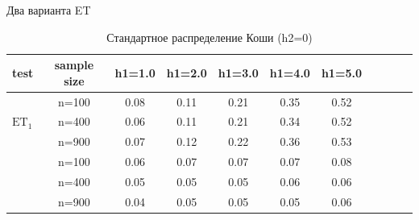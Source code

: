 \documentclass[handout]{beamer}
\begin{document}
\begin{frame}{Два варианта ET}
	\begin{table}[!h]
		\centering
		\caption{Стандартное распределение Коши (h2=0)}
		\hspace*{-0.6cm}\begin{tabular}{l c c c c c c c c c c} 
			\toprule
			test & sample size & h1=1.0 & h1=2.0 & h1=3.0 & h1=4.0 & h1=5.0 \\ 
			\midrule
			\multirow{3}{*}{$\text{ET}_1$} 
			& n=100 & 0.08 & 0.11 & 0.21 & 0.35 & 0.52 \\ 
			& n=400 & 0.06 & 0.11 & 0.21 & 0.34 & 0.52 \\ 
			& n=900 & 0.07 & 0.12 & 0.22 & 0.36 & 0.53 \\ 
			\addlinespace
			\addlinespace
			\multirow{3}{*}{$\text{ET}_2$} 
			& n=100 & 0.06 & 0.07 & 0.07 & 0.07 & 0.08  \\ 
			& n=400 & 0.05 & 0.05 & 0.05 & 0.06 & 0.06 \\ 
			& n=900 & 0.04 & 0.05 & 0.05 & 0.05 & 0.06 \\ 
			\bottomrule
		\end{tabular}
		\label{tbl:et_comp_cauchy_h1}
	\end{table}
\end{frame}
\end{document}
